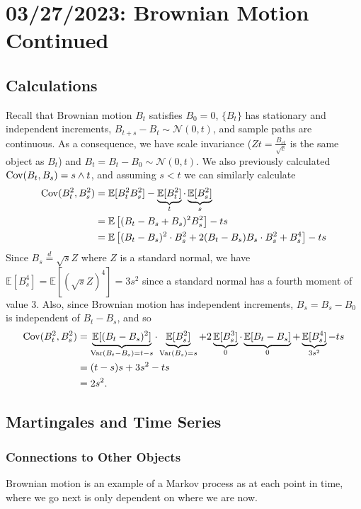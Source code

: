 \chapter{03/27/2023: Brownian Motion Continued}
\section{Calculations}
Recall that Brownian motion $B_t$ satisfies $B_0=0$, $\{B_t\}$ has stationary and independent increments, $B_{t+s}-B_t\sim\mathcal N(0,t)$, and sample paths are continuous. As a consequence, we have scale invariance ($Zt=\frac{B_{ct}}{\sqrt c}$ is the same object as $B_t$) and $B_t=B_t-B_0\sim\mathcal N(0,t)$. We also previously calculated $\operatorname{Cov}(B_t,B_s)=s\wedge t$, and assuming $s<t$ we can similarly calculate \begin{align*}
	\operatorname{Cov}(B_t^2,B_s^2) &= \mathbb E[B_t^2B_s^2] - \underbrace{\mathbb E[B_t^2]}_{t}\cdot\underbrace{\mathbb E[B_s^2]}_s \\
					  &= \mathbb E \left[ (B_t-B_s+B_s)^2 B_s^2 \right] - ts \\
					  &= \mathbb E \left[ (B_t-B_s)^2\cdot B_s^2 + 2(B_t-B_s)B_s\cdot B_s^2 + B_s^4 \right] - ts
\end{align*} Since $B_s\overset{d}{=}\sqrt s Z$ where $Z$ is a standard normal, we have $\mathbb E[B_s^4] = \mathbb E[(\sqrt s Z)^4] = 3s^2$ since a standard normal has a fourth moment of value 3. Also, since Brownian motion has independent increments, $B_s=B_s-B_0$ is independent of $B_t-B_s$, and so \begin{align*}
	\operatorname{Cov}(B_t^2,B_s^2) &= \underbrace{\mathbb E[(B_t-B_s)^2]}_{\operatorname{Var}(B_t-B_s)=t-s}\cdot\underbrace{\mathbb E[B_s^2]}_{\operatorname{Var}(B_s)=s} + 2\underbrace{\mathbb E[B_s^3]}_0\cdot\underbrace{\mathbb E[B_t-B_s]}_0 + \underbrace{\mathbb E[B_s^4]}_{3s^2} - ts \\
					  &= (t-s)s + 3s^2 - ts \\
					  &= 2s^2.
\end{align*}

\section{Martingales and Time Series}
\subsection{Connections to Other Objects}
Brownian motion is an example of a Markov process as at each point in time, where we go next is only dependent on where we are now.

